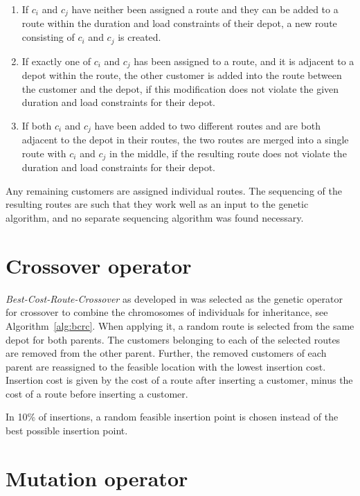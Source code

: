 \documentclass[paper=a4, fontsize=10pt]{scrartcl}
\begin{document}
\begin{multicols}{2}
\begin{enumerate}[label=\alph*)]
    \item If $c_i$ and $c_j$ have neither been assigned a route and they can be added to a route within the duration and load constraints of their depot, a new route consisting of $c_i$ and $c_j$ is created.
    \item If exactly one of $c_i$ and $c_j$ has been assigned to a route, and it is adjacent to a depot within the route, the other customer is added into the route between the customer and the depot, if this modification does not violate the given duration and load constraints for their depot.
    \item If both $c_i$ and $c_j$ have been added to two different routes and are both adjacent to the depot in their routes, the two routes are merged into a single route with $c_i$ and $c_j$ in the middle, if the resulting route does not violate the duration and load constraints for their depot.
\end{enumerate}

Any remaining customers are assigned individual routes. The sequencing of the resulting routes are such that they work well as an input to the genetic algorithm, and no separate sequencing algorithm was found necessary.

\section*{Crossover operator}

\textit{Best-Cost-Route-Crossover} as developed in \cite{ombuki2006multi} was selected as the genetic operator for crossover to combine the chromosomes of individuals for inheritance, see Algorithm~\ref{alg:bcrc}. When applying it, a random route is selected from the same depot for both parents. The customers belonging to each of the selected routes are removed from the other parent. Further, the removed customers of each parent are reassigned to the feasible location with the lowest insertion cost. Insertion cost is given by the cost of a route after inserting a customer, minus the cost of a route before inserting a customer.

In 10\% of insertions, a random feasible insertion point is chosen instead of the best possible insertion point.

\section*{Mutation operator}


\end{multicols}
\end{document}
